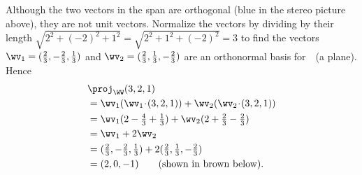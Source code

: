 \begin{example}
\begin{enumerate}[ref=\ref{eg:orthproj}(\alph*)]
{{}}%
\begin{center}\end{center}
\begin{solution} 
Although the two vectors in the span are orthogonal (blue in the stereo picture above), they are not unit vectors.  
Normalize the vectors by dividing by their length \(\sqrt{2^2+(-2)^2+1^2}=\sqrt{2^2+1^2+(-2)^2}=3\) to find the vectors \(\wv_1=(\frac23,-\frac23,\frac13)\) and  \(\wv_2=(\frac23,\frac13,-\frac23)\) are an orthonormal basis for~\WW\ (a plane).
Hence 
\begin{align*}
&\proj_\WW(3,2,1)
\\&=\wv_1(\wv_1\cdot(3,2,1))+\wv_2(\wv_2\cdot(3,2,1))
\\&=\wv_1(2-\tfrac43+\tfrac13)
+\wv_2(2+\tfrac23-\tfrac23)
\\&=\wv_1+2\wv_2
\\&=(\tfrac23,-\tfrac23,\tfrac13)+2(\tfrac23,\tfrac13,-\tfrac23)
\\&=(2,0,-1) 
\qquad(\text{shown in brown below}).
\end{align*}%
\begin{center}\end{center}
\end{solution}


\end{enumerate}
\end{example}
